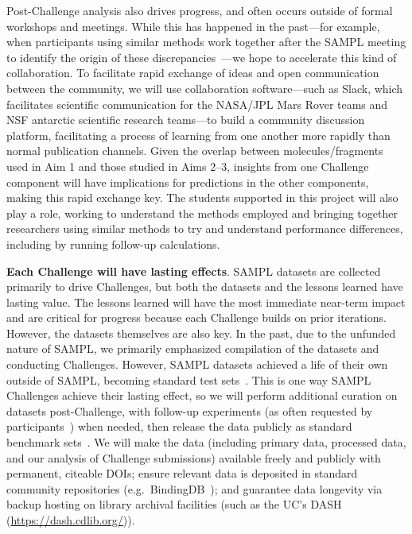 \documentclass[11pt]{article}
\begin{document}
Post-Challenge analysis also drives progress, and often occurs outside of formal workshops and meetings.
While this has happened in the past---for example, when participants using similar methods work together after the SAMPL meeting to identify the origin of these discrepancies~\cite{monroe_converging_2014, yin_overview_2016, bhakat_resolving_2016, bosisio_blinded_2016, Mobley:2017:AnnualReviewofBiophysics}---we hope to accelerate this kind of collaboration.
To facilitate rapid exchange of ideas and open communication between the community, we will use collaboration software---such as Slack, which facilitates scientific communication for the NASA/JPL Mars Rover teams and NSF antarctic scientific research teams---to build a community discussion platform, 
facilitating a process of learning from one another more rapidly than normal publication channels. 
Given the overlap between molecules/fragments used in Aim 1 and those studied in Aims 2--3, insights from one Challenge component will have implications for predictions in the other components, making this rapid exchange key.
The students supported in this project will also play a role, working to understand the methods employed and bringing together researchers using similar methods to try and understand performance differences, including by running follow-up calculations.  


\textbf{Each Challenge will have lasting effects}.
SAMPL datasets are collected primarily to drive Challenges, but both the datasets and the lessons learned have lasting value.
The lessons learned will have the most immediate near-term impact and are critical for progress because each Challenge builds on prior iterations. 
However, the datasets themselves are also key.
In the past, due to the unfunded nature of SAMPL, we primarily emphasized compilation of the datasets and conducting Challenges. 
However, SAMPL datasets achieved a life of their own outside of SAMPL, becoming standard test sets~\cite{Mobley:2014:JComputAidedMolDes, DuarteRamosMatos:2017:J.Chem.Eng.Data, Mobley:2017:AnnualReviewofBiophysics, Yang:2017:arXiv:1705.10035[q-bio], Gosink:2017:J.Phys.Chem.B}.
This is one way SAMPL Challenges achieve their lasting effect, so we will perform additional curation on datasets post-Challenge, with follow-up experiments (as often requested by participants~\cite{Mobley:2017:eScholarship}) when needed, then release the data publicly as standard benchmark sets~\cite{Mobley:2017:AnnualReviewofBiophysics}.
We will make the data (including primary data, processed data, and our analysis of Challenge submissions) available freely and publicly with permanent, citeable DOIs; ensure relevant data is deposited in standard community repositories (e.g.~BindingDB~\cite{Liu:2007:Nucl.AcidsRes.}); and guarantee data longevity via backup hosting on library archival facilities (such as the UC's DASH (\url{https://dash.cdlib.org/})).
\end{document}
